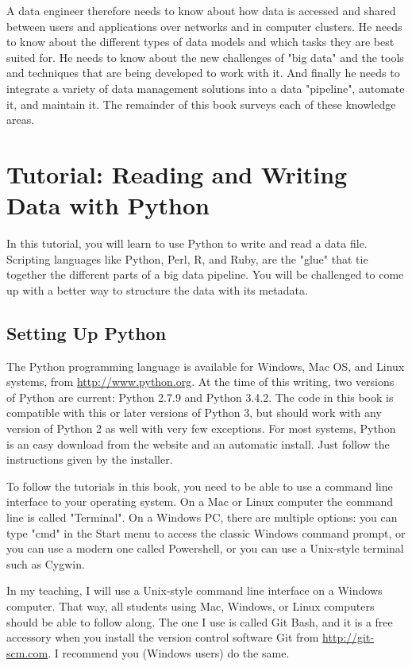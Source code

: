 \documentclass[11pt]{book}
\begin{document}
A data engineer therefore needs to know about how data is accessed and shared between users and applications over networks and in computer clusters.  He needs to know about the different types of data models and which tasks they are best suited for.  He needs to know about the new challenges of "big data" and the tools and techniques that are being developed to work with it.  And finally he needs to integrate a variety of data management solutions into a data "pipeline", automate it, and maintain it.  The remainder of this book surveys each of these knowledge areas.

\section*{Tutorial: Reading and Writing Data with Python}

In this tutorial, you will learn to use Python to write and read a data file.  Scripting languages like Python, Perl, R, and Ruby, are the "glue" that tie together the different parts of a big data pipeline.  You will be challenged to come up with a better way to structure the data with its metadata.

\subsection*{Setting Up Python}

The Python programming language is available for Windows, Mac OS, and Linux systems, from \url{http://www.python.org}.  At the time of this writing, two versions of Python are current: Python 2.7.9 and Python 3.4.2.  The code in this book is compatible with this or later versions of Python 3, but should work with any version of Python 2 as well with very few exceptions.  For most systems, Python is an easy download from the website and an automatic install.  Just follow the instructions given by the installer.

To follow the tutorials in this book, you need to be able to use a command line interface to your operating system.  On a Mac or Linux computer the command line is called "Terminal".  On a Windows PC, there are multiple options: you can type "cmd" in the Start menu to access the classic Windows command prompt, or you can use a modern one called Powershell, or you can use a Unix-style terminal such as Cygwin.

In my teaching, I will use a Unix-style command line interface on a Windows computer.  That way, all students using Mac, Windows, or Linux computers should be able to follow along.  The one I use is called Git Bash, and it is a free accessory when you install the version control software Git from \url{http://git-scm.com}.  I recommend you (Windows users) do the same.
\end{document}
